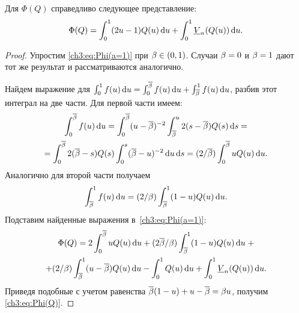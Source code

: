 {\begin{lemma}\label{ch3:lem:Phi}
  Для $\Phi(Q)$ справедливо следующее представление:
  \begin{equation}\label{ch3:eq:Phi(Q)}
    \Phi(Q) = \int_0^1 (2u - 1) Q(u) \di u + \int_0^1 \LV{n}(Q(u)) \di u.
  \end{equation}
\end{lemma}
\begin{proof}
  Упростим \eqref{ch3:eq:Phi(a=1)} при $\beta \in (0, 1)$. Случаи $\beta = 0$ и $\beta = 1$ дают тот же результат и рассматриваются аналогично.

  Найдем выражение для $\int_0^1 f(u) \mathop{}\!\mathrm{d} u = \int_0^{{{\overline{\beta}}}} f(u) \mathop{}\!\mathrm{d} u + \int_{{{\overline{\beta}}}}^1 f(u) \mathop{}\!\mathrm{d} u$, разбив этот интеграл на две части.
  Для первой части имеем:
  \begin{multline*}
    \int_0^{{{\overline{\beta}}}} f(u) \mathop{}\!\mathrm{d} u = \int_0^{{{\overline{\beta}}}} (u - {{\overline{\beta}}})^{-2} \int_{{{\overline{\beta}}}}^u 2(s - {{\overline{\beta}}}) Q(s) \mathop{}\!\mathrm{d} s = \\
    = \int_0^{{{\overline{\beta}}}} 2 ({{\overline{\beta}}} - s) Q(s) \int_0^s ({{\overline{\beta}}} - u)^{-2} \mathop{}\!\mathrm{d} u \mathop{}\!\mathrm{d} s =
    (2/{{\overline{\beta}}}) \int_0^{{{\overline{\beta}}}} u Q(u) \mathop{}\!\mathrm{d} u.
  \end{multline*}
  Аналогично для второй части получаем
  \begin{gather*}
    \int_{{{\overline{\beta}}}}^1 f(u) \mathop{}\!\mathrm{d} u = (2/\beta) \int_{{{\overline{\beta}}}}^1 (1-u) Q(u) \mathop{}\!\mathrm{d} u.
  \end{gather*}
  Подставим найденные выражения в~\eqref{ch3:eq:Phi(a=1)}:
  \begin{multline*}
    \Phi(Q) = 2 \int_0^\DCo u Q(u) \di u + (2\DCo/\Co) \int_\DCo^1 (1-u) Q(u) \di u \; + \\
    + (2/\Co) \int_\DCo^1 (u - \DCo) Q(u) \di u - \int_0^1 Q(u) \di u + \int_0^1
    \LV{n}(Q(u)) \di u.
  \end{multline*}
  Приведя подобные с учетом равенства ${{\overline{\beta}}} (1-u) + u - {{\overline{\beta}}} = \beta u$, получим
  \eqref{ch3:eq:Phi(Q)}.
\end{proof}

}
